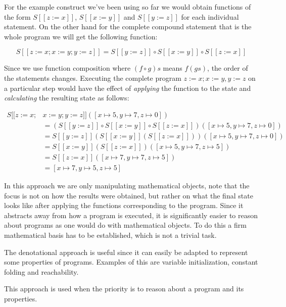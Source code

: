 For the example construct we've been using so far we would obtain functions of the form $S [\![ z:=x ]\!]$, $S [\![ x:=y ]\!]$ and $S [\![ y:=z ]\!]$ for each individual statement.
On the other hand for the complete compound statement that is the whole program we will get the following function:

\begin{equation*}
S [\![ z:=x; x:=y; y:=z ]\!] = S [\![ y:=z ]\!] \circ S [\![ x:=y ]\!] \circ S [\![ z:=x ]\!]
\end{equation*}

Since we use function composition where $(f \circ g) s$ means $f(g s)$, the order of the statements changes.
Executing the complete program $z:=x; x:=y, y:=z$ on a particular step would have the effect of \textit{applying} the function to the state and \textit{calculating} the resulting state as follows:

\begin{align*}
S [\![ z:=x; & x:=y; y:=z ]\!]([x\mapsto5, y\mapsto7, z\mapsto0])\\
&= (S [\![ y:=z ]\!] \circ S [\![ x:=y ]\!] \circ S [\![ z:=x ]\!])([x\mapsto5, y\mapsto7, z\mapsto0])\\
&= S [\![ y:=z ]\!](S [\![ x:=y ]\!] (S [\![ z:=x ]\!]))([x\mapsto5, y\mapsto7, z\mapsto0])\\
&= S [\![ x:=y ]\!] (S [\![ z:=x ]\!])([x\mapsto5, y\mapsto7, z\mapsto5])\\
&= S [\![ z:=x ]\!]([x\mapsto7, y\mapsto7, z\mapsto5])\\
&= [x\mapsto7, y\mapsto5, z\mapsto5]
\end{align*}

In this approach we are only manipulating mathematical objects, note that the focus is not on how the results were obtained, but rather on what the final state looks like after applying the functions corresponding to the program.
Since it abstracts away from how a program is executed, it is significantly easier to reason about programs as one would do with mathematical objects.
To do this a firm mathematical basis has to be established, which is not a trivial task.

The denotational approach is useful since it can easily be adapted to represent some properties of programs.
Examples of this are variable initialization, constant folding and reachability.

This approach is used when the priority is to reason about a program and its properties.

\begin{comment}
what the program does oposed to how it does it. Modifying mathematical objects.
\end{comment}

